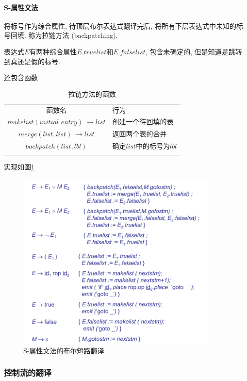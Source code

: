 \documentclass{ctexart}
\newlength{\Oldarrayrulewidth}
\newcommand{\Hline}[1]{
  \noalign{\global\setlength{\Oldarrayrulewidth}{\arrayrulewidth}}
  \noalign{\global\setlength{\arrayrulewidth}{#1}}\hline
  \noalign{\global\setlength{\arrayrulewidth}{\Oldarrayrulewidth}}}
\newcommand{\Topline}{\Hline{0.08em}}
\newcommand{\Bottomline}{\Hline{0.08em}}
\newcommand{\Midline}{\Hline{0.05em}}
\begin{document}
\paragraph{S-属性文法}
    将标号作为综合属性, 待顶层布尔表达式翻译完后,
    将所有下层表达式中未知的标号回填. 称为拉链方法 (backpatching).\par
    表达式$E$有两种综合属性$E.truelist$和$E.falselist$,
    包含未确定的, 但是知道是跳转到真还是假的标号.\par
    还包含函数
    \begin{table}[ht!]
        \centering
        \begin{tabularx}{\textwidth}{cL}
            \Topline
            函数名 & 行为\\
            \Midline
            $makelist(initial\_entry)\;\to list$ & 创建一个待回填的表\\
            $merge(list, list)\;\to list$ & 返回两个表的合并\\
            $backpatch(list, lbl)$ & 确定$list$中的标号为$lbl$\\
            \Bottomline
        \end{tabularx}
        \caption{拉链方法的函数}
    \end{table}
    实现如图\ref{bool-2}
    \begin{figure}[ht]
    \centering
    \includegraphics[width=0.9\textwidth]{bool-2.png}
    \caption{S-属性文法的布尔短路翻译}
    \label{bool-2}
    \end{figure}

\subsubsection{控制流的翻译}
\end{document}
